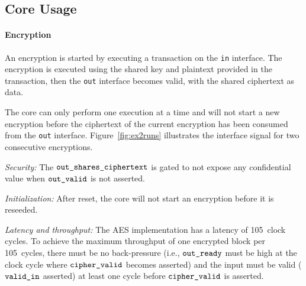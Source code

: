 \documentclass{scrartcl}
\begin{document}
\subsection{Core Usage}

\paragraph{Encryption}
An encryption is started by executing a transaction on the \texttt{in} interface.
The encryption is executed using the shared key and plaintext provided in the
transaction, then the \texttt{out} interface becomes valid, with the shared
ciphertext as data.

The core can only perform one execution at a time and will not start a new
encryption before the ciphertext of the current encryption has been consumed from
the \texttt{out} interface.
Figure~\ref{fig:ex2runs} illustrates the interface signal for two consecutive encryptions.

\emph{Security:}
The $\texttt{out\_shares\_ciphertext}$ is gated to not expose any confidential value when
$\texttt{out\_valid}$ is not asserted.

\emph{Initialization:}
After reset, the core will not start an encryption before it is reseeded.

\emph{Latency and throughput:}
The AES implementation has a latency of 105~clock cycles. To achieve the
maximum throughput of one encrypted block per 105~cycles, there must be no
back-pressure (i.e., $\texttt{out\_ready}$ must be high at the clock cycle where
$\texttt{cipher\_valid}$ becomes asserted) and the input must be valid
($\texttt{valid\_in}$ asserted) at least one cycle before $\texttt{cipher\_valid}$ is
asserted.
\end{document}
